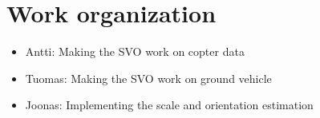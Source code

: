 \documentclass{beamer}
\begin{document}
\section{Work organization}
\begin{frame}
\begin{itemize}
  \item Antti: Making the SVO work on copter data
  \item Tuomas: Making the SVO work on ground vehicle
  \item Joonas: Implementing the scale and orientation estimation
\end{itemize}
\end{frame}


\end{document}
